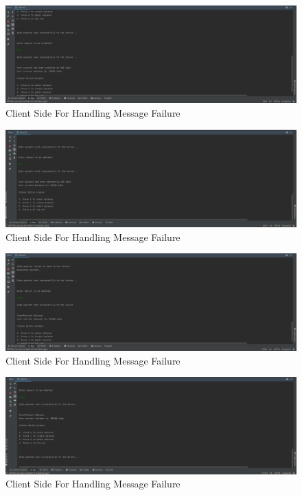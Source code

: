 \documentclass[11pt]{article}
\begin{document}
\begin{figure}[!h]
\centering
\includegraphics[width=\textwidth]{message3.png}
\caption{Client Side For Handling Message Failure}
\end{figure}
\begin{figure}[!h]
\centering
\includegraphics[width=\textwidth]{message4.png}
\caption{Client Side For Handling Message Failure}
\end{figure}
\begin{figure}[!h]
\centering
\includegraphics[width=\textwidth]{message5.png}
\caption{Client Side For Handling Message Failure}
\end{figure}
\begin{figure}[!h]
\centering
\includegraphics[width=\textwidth]{message6.png}
\caption{Client Side For Handling Message Failure}
\end{figure}
\end{document}
